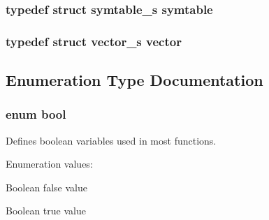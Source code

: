 \subsubsection{\setlength{\rightskip}{0pt plus 5cm}typedef struct {\bf symtable\_\-s} symtable}\label{defines_8h_a108}


\subsubsection{\setlength{\rightskip}{0pt plus 5cm}typedef struct {\bf vector\_\-s} vector}\label{defines_8h_a101}




\subsection{Enumeration Type Documentation}
\subsubsection{\setlength{\rightskip}{0pt plus 5cm}enum bool}\label{defines_8h_a115}


Defines boolean variables used in most functions. \begin{Desc}
\item[Enumeration values:]\par
\begin{description}
\item[{\em 
{\em FALSE}\label{defines_8h_a115a113}
}]Boolean false value \item[{\em 
{\em TRUE}\label{defines_8h_a115a114}
}]Boolean true value \end{description}
\end{Desc}

